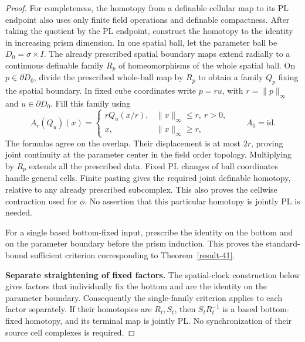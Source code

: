 \documentclass[11pt,a4paper]{article}
\theoremstyle{definition}
\begin{document}
\begin{proof}
For completeness, the homotopy from a definable cellular map
to its PL endpoint also uses only finite field operations and
definable compactness. After taking the quotient by the PL
endpoint, construct the homotopy to the identity in increasing
prism dimension. In one spatial ball, let the parameter ball
be $D_0=\sigma\times I$. The already prescribed spatial
boundary maps extend radially to a continuous definable
family $R_p$ of homeomorphisms of the whole spatial ball.
On $p\in\partial D_0$, divide the prescribed whole-ball map
by $R_p$ to obtain a family $Q_p$ fixing the spatial boundary.
In fixed cube coordinates write $p=ru$, with
$r=\|p\|_\infty$ and $u\in\partial D_0$. Fill this family
using
\begin{equation}
 A_r(Q_u)(x)=
 \begin{cases}
 rQ_u(x/r),&\|x\|_\infty\le r,\ r>0,\\
 x,&\|x\|_\infty\ge r,
 \end{cases}
 \qquad A_0=\mathrm{id}.
 \label{equation-110}
\end{equation}
The formulas agree on the overlap. Their displacement is at
most $2r$, proving joint continuity at the parameter center
in the field order topology. Multiplying by $R_p$ extends
all the prescribed data. Fixed PL changes of ball coordinates
handle general cells. Finite pasting gives the required joint
definable homotopy, relative to any already prescribed
subcomplex. This also proves the cellwise contraction used
for $\phi$. No assertion that this particular homotopy is
jointly PL is needed.

For a single based bottom-fixed input, prescribe the identity
on the bottom and on the parameter boundary before the prism
induction. This proves the standard-bound sufficient criterion
corresponding to Theorem~\ref{result-41}.

\textbf{Separate straightening of fixed factors.}\quad
The spatial-clock construction below gives factors that individually
fix the bottom and are the identity on the parameter boundary.
Consequently the single-family criterion applies to each factor
separately.  If their homotopies are $R_t,S_t$, then $S_tR_t^{-1}$
is a based bottom-fixed homotopy, and its terminal map is jointly PL.
No synchronization of their source cell complexes is required.


\end{proof}
\end{document}
